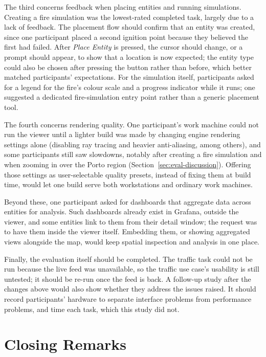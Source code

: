 The third concerns feedback when placing entities and running simulations. Creating a fire simulation was the lowest-rated completed task, largely due to a lack of feedback. The placement flow should confirm that an entity was created, since one participant placed a second ignition point because they believed the first had failed. After \emph{Place Entity} is pressed, the cursor should change, or a prompt should appear, to show that a location is now expected; the entity type could also be chosen after pressing the button rather than before, which better matched participants' expectations. For the simulation itself, participants asked for a legend for the fire's colour scale and a progress indicator while it runs; one suggested a dedicated fire-simulation entry point rather than a generic placement tool.

The fourth concerns rendering quality. One participant's work machine could not run the viewer until a lighter build was made by changing engine rendering settings alone (disabling ray tracing and heavier anti-aliasing, among others), and some participants still saw slowdowns, notably after creating a fire simulation and when zooming in over the Porto region (Section~\ref{sec:eval-discussion}). Offering those settings as user-selectable quality presets, instead of fixing them at build time, would let one build serve both workstations and ordinary work machines.

Beyond these, one participant asked for dashboards that aggregate data across entities for analysis. Such dashboards already exist in Grafana, outside the viewer, and some entities link to them from their detail window; the request was to have them inside the viewer itself. Embedding them, or showing aggregated views alongside the map, would keep spatial inspection and analysis in one place.

Finally, the evaluation itself should be completed. The traffic task could not be run because the live feed was unavailable, so the traffic use case's usability is still untested; it should be re-run once the feed is back. A follow-up study after the changes above would also show whether they address the issues raised. It should record participants' hardware to separate interface problems from performance problems, and time each task, which this study did not.

\section{Closing Remarks}
\label{sec:conc-closing}

